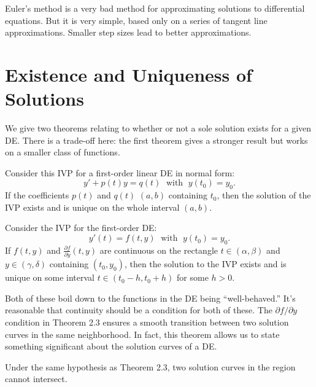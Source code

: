 \documentclass[../m082main.tex]{subfiles}
\begin{document}
Euler's method is a very bad method for approximating solutions to differential equations.
But it is very simple, based only on a series of tangent line approximations.
Smaller step sizes lead to better approximations.

\section{Existence and Uniqueness of Solutions}
We give two theorems relating to whether or not a sole solution exists for a given DE.
There is a trade-off here: the first theorem gives a stronger result but works on a smaller class of functions.

\begin{theorem}
    Consider this IVP for a first-order linear DE in normal form:
    \[ y' + p(t)y = q(t) \;\text{ with }\; y(t_0) = y_0. \]
    If the coefficients $p(t)$ and $q(t)$  $(a, b)$ containing $t_0$, then the solution of the IVP exists and is unique on the whole interval $(a, b)$.
\end{theorem}

\begin{theorem}
    Consider the IVP for the first-order DE:
    \[ y'(t) = f(t, y) \;\text{ with }\; y(t_0) = y_0. \]
    If $f(t, y)$ and $\frac{\partial f}{\partial y}(t, y)$ are continuous on the rectangle $t \in (\alpha, \beta)$ and $y \in (\gamma, \delta)$ containing $(t_0, y_0)$, then the solution to the IVP exists and is unique on some interval $t \in (t_0 - h, t_0 + h)$ for some $h > 0$.
\end{theorem}

Both of these boil down to the functions in the DE being ``well-behaved.''
It's reasonable that continuity should be a condition for both of these.
The $\partial f / \partial y$ condition in Theorem 2.3 ensures a smooth transition between two solution curves in the same neighborhood.
In fact, this theorem allows us to state something significant about the solution curves of a DE.

\begin{corollary}
    Under the same hypothesis as Theorem 2.3, two solution curves in the region cannot intersect.
\end{corollary}
\end{document}
